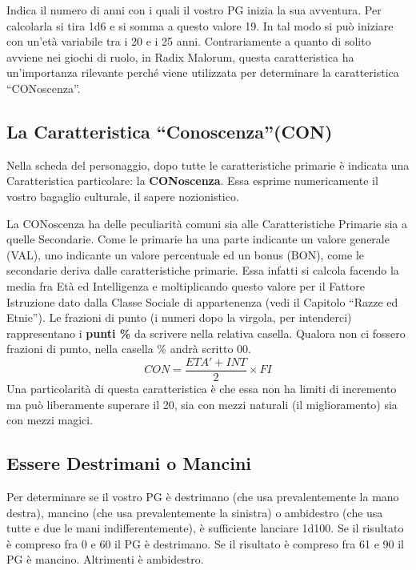 Indica il numero di anni con i quali il vostro PG inizia la sua
avventura. Per calcolarla si tira 1d6 e si somma a questo valore 19.
In tal modo si pu\`o iniziare con un'et\`a variabile tra i 20 e i
25 anni.  Contrariamente a quanto di solito avviene nei giochi di
ruolo, in Radix Malorum, questa caratteristica ha un'importanza
rilevante perch\'e viene utilizzata per determinare la caratteristica
``CONoscenza''.


{\raggedright \subsection{La Caratteristica ``Conoscenza''(CON)}}
\label{CONoscenza}

Nella scheda del personaggio, dopo tutte le caratteristiche primarie
\`e indicata una Caratteristica particolare: la \textbf{CONoscenza}.  Essa
esprime numericamente il vostro bagaglio culturale, il sapere
nozionistico. 

La CONoscenza ha delle peculiarit\`a comuni sia alle
Caratteristiche Primarie sia a quelle Secondarie. Come le primarie ha
una parte indicante un valore generale (VAL), uno indicante un valore
percentuale ed un bonus (BON), come le secondarie deriva dalle
caratteristiche primarie.  Essa infatti si calcola facendo la media
fra Et\`a ed Intelligenza e moltiplicando questo valore per il
Fattore Istruzione dato dalla Classe Sociale di appartenenza (vedi il
Capitolo ``Razze ed Etnie''). Le frazioni di punto (i numeri dopo la
virgola, per intenderci) rappresentano i \textbf{punti \%} da scrivere
nella relativa casella. Qualora non ci fossero frazioni di punto, nella
casella \% andr\`a scritto 00.
\iffullversion $$CON = \frac{ETA' + INT}{2} \times FI$$ \fi
Una particolarit\`a di questa caratteristica \`e che essa non ha
limiti di incremento ma pu\`o liberamente superare il 20, sia con
mezzi naturali (il miglioramento) sia con mezzi magici.

\subsection{Essere Destrimani o Mancini}

Per determinare se il vostro PG \`e destrimano (che usa
prevalentemente la mano destra), mancino (che usa prevalentemente la
sinistra) o ambidestro (che usa tutte e due le mani
indifferentemente), \`e sufficiente lanciare 1d100. Se il risultato
\`e compreso fra 0 e 60 il PG \`e destrimano.  Se il risultato
\`e compreso fra 61 e 90 il PG \`e mancino. Altrimenti \`e
ambidestro.

